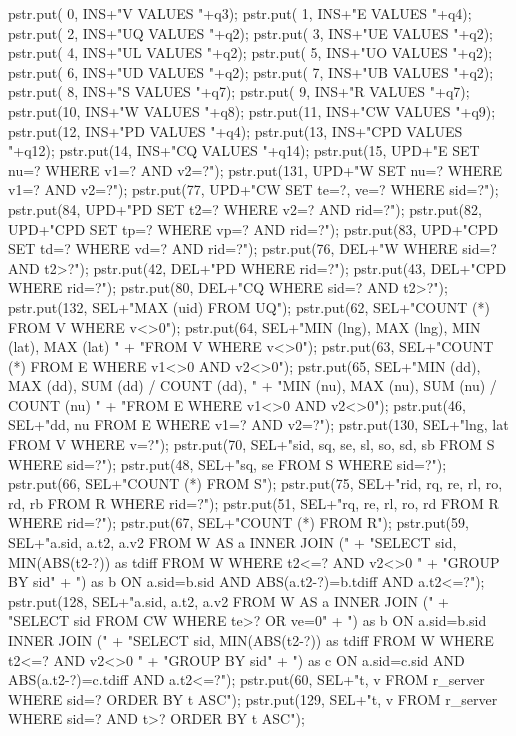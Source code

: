 \documentclass{article}
\theoremstyle{definition}
\begin{document}
  pstr.put( 0, INS+"V VALUES "+q3);
  pstr.put( 1, INS+"E VALUES "+q4);
  pstr.put( 2, INS+"UQ VALUES "+q2);
  pstr.put( 3, INS+"UE VALUES "+q2);
  pstr.put( 4, INS+"UL VALUES "+q2);
  pstr.put( 5, INS+"UO VALUES "+q2);
  pstr.put( 6, INS+"UD VALUES "+q2);
  pstr.put( 7, INS+"UB VALUES "+q2);
  pstr.put( 8, INS+"S VALUES "+q7);
  pstr.put( 9, INS+"R VALUES "+q7);
  pstr.put(10, INS+"W VALUES "+q8);
  pstr.put(11, INS+"CW VALUES "+q9);
  pstr.put(12, INS+"PD VALUES "+q4);
  pstr.put(13, INS+"CPD VALUES "+q12);
  pstr.put(14, INS+"CQ VALUES "+q14);
  pstr.put(15, UPD+"E SET nu=? WHERE v1=? AND v2=?");
  pstr.put(131, UPD+"W SET nu=? WHERE v1=? AND v2=?");
  pstr.put(77, UPD+"CW SET te=?, ve=? WHERE sid=?");
  pstr.put(84, UPD+"PD SET t2=? WHERE v2=? AND rid=?");
  pstr.put(82, UPD+"CPD SET tp=? WHERE vp=? AND rid=?");
  pstr.put(83, UPD+"CPD SET td=? WHERE vd=? AND rid=?");
  pstr.put(76, DEL+"W WHERE sid=? AND t2>?");
  pstr.put(42, DEL+"PD WHERE rid=?");
  pstr.put(43, DEL+"CPD WHERE rid=?");
  pstr.put(80, DEL+"CQ WHERE sid=? AND t2>?");
  pstr.put(132, SEL+"MAX (uid) FROM UQ");
  pstr.put(62, SEL+"COUNT (*) FROM V WHERE v<>0");
  pstr.put(64, SEL+"MIN (lng), MAX (lng), MIN (lat), MAX (lat) "
      + "FROM V WHERE v<>0");
  pstr.put(63, SEL+"COUNT (*) FROM E WHERE v1<>0 AND v2<>0");
  pstr.put(65, SEL+"MIN (dd), MAX (dd), SUM (dd) / COUNT (dd), "
      + "MIN (nu), MAX (nu), SUM (nu) / COUNT (nu) "
      + "FROM E WHERE v1<>0 AND v2<>0");
  pstr.put(46, SEL+"dd, nu FROM E WHERE v1=? AND v2=?");
  pstr.put(130, SEL+"lng, lat FROM V WHERE v=?");
  pstr.put(70, SEL+"sid, sq, se, sl, so, sd, sb FROM S WHERE sid=?");
  pstr.put(48, SEL+"sq, se FROM S WHERE sid=?");
  pstr.put(66, SEL+"COUNT (*) FROM S");
  pstr.put(75, SEL+"rid, rq, re, rl, ro, rd, rb FROM R WHERE rid=?");
  pstr.put(51, SEL+"rq, re, rl, ro, rd FROM R WHERE rid=?");
  pstr.put(67, SEL+"COUNT (*) FROM R");
  pstr.put(59, SEL+"a.sid, a.t2, a.v2 FROM W AS a INNER JOIN ("
      + "SELECT sid, MIN(ABS(t2-?)) as tdiff FROM W WHERE t2<=? AND v2<>0 "
      + "GROUP BY sid"
      + ") as b ON a.sid=b.sid AND ABS(a.t2-?)=b.tdiff AND a.t2<=?");
  pstr.put(128, SEL+"a.sid, a.t2, a.v2 FROM W AS a INNER JOIN ("
      + "SELECT sid FROM CW WHERE te>? OR ve=0"
      + ") as b ON a.sid=b.sid INNER JOIN ("
      + "SELECT sid, MIN(ABS(t2-?)) as tdiff FROM W WHERE t2<=? AND v2<>0 "
      + "GROUP BY sid"
      + ") as c ON a.sid=c.sid AND ABS(a.t2-?)=c.tdiff AND a.t2<=?");
  pstr.put(60, SEL+"t, v FROM r_server WHERE sid=? ORDER BY t ASC");
  pstr.put(129, SEL+"t, v FROM r_server WHERE sid=? AND t>? ORDER BY t ASC");
\end{document}
